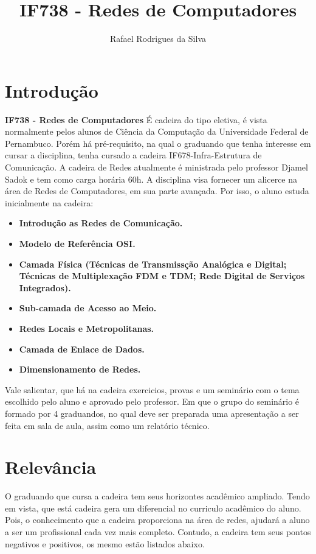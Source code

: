 \documentclass[10pt,a4paper]{article}
\title{IF738 - Redes de Computadores}
\author{Rafael Rodrigues da Silva}
\begin{document}
\maketitle

\section{Introdução}
\textbf{IF738 - Redes de Computadores} É cadeira do tipo eletiva, é vista normalmente pelos alunos de Ciência da Computação da Universidade Federal de Pernambuco. Porém há pré-requisito, na qual o graduando que tenha interesse em cursar a disciplina, tenha cursado a cadeira IF678-Infra-Estrutura de Comunicação. A cadeira de Redes atualmente é ministrada pelo professor Djamel Sadok e tem como carga horária 60h. A disciplina visa fornecer um alicerce na área de Redes de Computadores, em sua parte avançada. Por isso, o aluno estuda inicialmente na cadeira:

\begin{itemize}
\item \textbf{Introdução as Redes de Comunicação.}
\item \textbf{Modelo de Referência OSI.}
\item \textbf{Camada Física (Técnicas de Transmissção Analógica e Digital; Técnicas de Multiplexação FDM e TDM; Rede Digital de Serviços Integrados).}
\item \textbf{Sub-camada de Acesso ao Meio.}
\item \textbf{Redes Locais e Metropolitanas.}
\item \textbf{Camada de Enlace de Dados.}
\item \textbf{Dimensionamento de Redes.}
\end{itemize}

Vale salientar, que há na cadeira exercicios, provas e um seminário com o tema escolhido pelo aluno e aprovado pelo professor. Em que o grupo do seminário é formado por 4 graduandos, no qual deve ser preparada uma apresentação a ser feita em sala de aula, assim como um relatório técnico.

\section{Relevância}
O graduando que cursa a cadeira tem seus horizontes acadêmico ampliado. Tendo em vista, que está cadeira gera um diferencial no curriculo acadêmico do aluno. Pois, o conhecimento que a cadeira proporciona na área de redes, ajudará a aluno a ser um profissional cada vez mais completo. Contudo, a cadeira tem seus pontos negativos e positivos, os mesmo estão listados abaixo.
\end{document}
